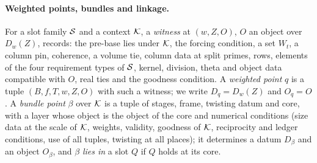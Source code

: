 \paragraph{Weighted points, bundles and linkage.}
For a slot family $\mathcal S$ and a context $\mathcal K$, a \emph{witness} at $(w,Z,O)$, $O$ an object over $D_w(Z)$, records: the
pre-base lies under $\mathcal K$, the forcing condition, a set $W_t$, a column pin, coherence, a volume tie, column data at split
primes, rows, elements of the four requirement types of $\mathcal S$, kernel, division, theta and object data compatible with $O$,
real ties and the goodness condition. A \emph{weighted point} $q$ is a tuple $(B,f,T,w,Z,O)$ with such a witness; we write
$D_q=D_w(Z)$ and $O_q=O$. A \emph{bundle point} $\beta$ over $\mathcal K$ is a tuple of stages, frame, twisting datum and core, with a
layer whose object is the object of the core and numerical conditions (size data at the scale of $\mathcal K$, weights, validity,
goodness of $\mathcal K$, reciprocity and ledger conditions, use of all tuples, twisting at all places); it determines a datum
$D_\beta$ and an object $O_\beta$, and $\beta$ \emph{lies in} a slot $Q$ if $Q$ holds at its core.


